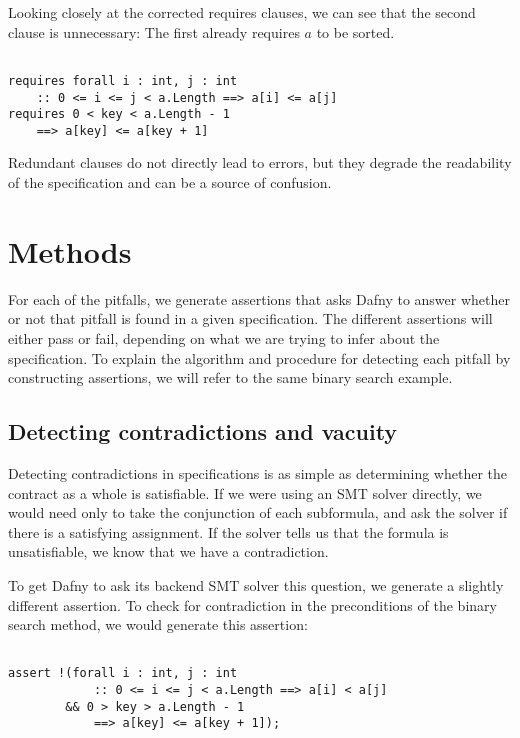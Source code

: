 \documentclass[sigplan,screen,anonymous]{acmart}
\begin{document}
Looking closely at the corrected requires clauses, we can see that the second clause is unnecessary:
The first already requires \(a\) to be sorted.

\begin{lstlisting}[language=dafny]

requires forall i : int, j : int
    :: 0 <= i <= j < a.Length ==> a[i] <= a[j]
requires 0 < key < a.Length - 1
    ==> a[key] <= a[key + 1]

\end{lstlisting}

Redundant clauses do not directly lead to errors, but they degrade the readability of the specification and can be a source of confusion.

\section{Methods}

For each of the pitfalls, we generate assertions that asks Dafny to answer whether or not that pitfall is found in a given specification. The different assertions will either pass or fail, depending on what we are trying to infer about the specification. To explain the algorithm and procedure for detecting each pitfall by constructing assertions, we will refer to the same binary search example.

\subsection{Detecting contradictions and vacuity}

Detecting contradictions in specifications is as simple as determining whether the contract as a whole is satisfiable.
If we were using an SMT solver directly, we would need only to take the conjunction of each subformula, and ask the solver if there is a satisfying assignment. If the solver tells us that the
formula is unsatisfiable, we know that we have a contradiction.

To get Dafny to ask its backend SMT solver this question, we generate a slightly different assertion. To check for contradiction in the preconditions of the binary search method, we would generate this assertion:

\begin{lstlisting}[language=dafny]

assert !(forall i : int, j : int
            :: 0 <= i <= j < a.Length ==> a[i] < a[j]
        && 0 > key > a.Length - 1
            ==> a[key] <= a[key + 1]);

\end{lstlisting}
\end{document}
